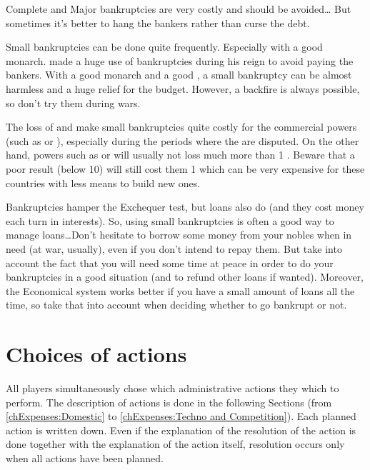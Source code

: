 \begin{playtip}
  Complete and Major bankruptcies are very costly and should be avoided\ldots
  But sometimes it's better to hang the bankers rather than curse the debt.

  Small bankruptcies can be done quite frequently. Especially with a good
  monarch.  made a huge use of bankruptcies during his
  reign to avoid paying the bankers. With a good monarch and a good \STAB, a
  small bankruptcy can be almost harmless and a huge relief for the
  budget. However, a backfire is always possible, so don't try them during
  wars.

  The loss of \TradeFLEET and \TFI make small bankruptcies quite costly for
  the commercial powers (such as \ANG or \HOL), especially during the periods
  where the  are disputed. On the other hand, powers such
  as \RUS or \POL will usually not loss much more than 1 \STAB. Beware that a
  poor result (below 10) will still cost them 1 \MNU which can be very
  expensive for these countries with less means to build new ones.

  Bankruptcies hamper the Exchequer test, but loans also do (and they cost
  money each turn in interests). So, using small bankruptcies is often a good
  way to manage loans\ldots Don't hesitate to borrow some money from your
  nobles when in need (at war, usually), even if you don't intend to repay
  them. But take into account the fact that you will need some time at peace
  in order to do your bankruptcies in a good situation (and to refund other
  loans if wanted). Moreover, the Economical system works better if you have a
  small amount of loans all the time, so take that into account when deciding
  whether to go bankrupt or not.
\end{playtip}



\section{Choices of actions}\label{chExpenses:Choice of actions}
\aparag All players simultaneously chose which administrative actions they
which to perform. The description of actions is done in the following Sections
(from \ref{chExpenses:Domestic} to \ref{chExpenses:Techno and Competition}).
\bparag Each planned action is written down. Even if the explanation of the
resolution of the action is done together with the explanation of the action
itself, resolution occurs only when all actions have been planned.

